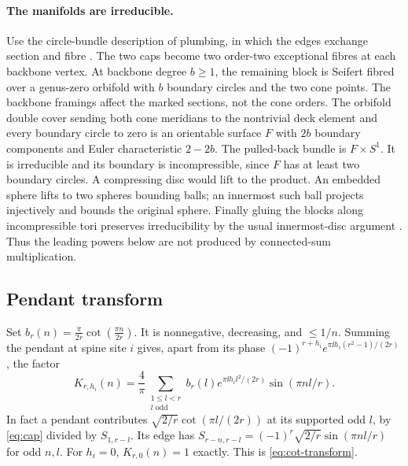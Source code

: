 \paragraph{The manifolds are irreducible.}
Use the circle-bundle description of plumbing, in which the edges exchange section and fibre \cite{EN}. The two caps become two order-two exceptional fibres at each backbone vertex. At backbone degree \(b\ge1\), the remaining block is Seifert fibred over a genus-zero orbifold with \(b\) boundary circles and the two cone points. The backbone framings affect the marked sections, not the cone orders. The orbifold double cover sending both cone meridians to the nontrivial deck element and every boundary circle to zero is an orientable surface \(F\) with \(2b\) boundary components and Euler characteristic \(2-2b\). The pulled-back bundle is \(F\times S^1\). It is irreducible and its boundary is incompressible, since \(F\) has at least two boundary circles. A compressing disc would lift to the product. An embedded sphere lifts to two spheres bounding balls; an innermost such ball projects injectively and bounds the original sphere. Finally gluing the blocks along incompressible tori preserves irreducibility by the usual innermost-disc argument \cite{Hatcher}. Thus the leading powers below are not produced by connected-sum multiplication.

\subsection{Pendant transform}
Set \(b_r(n)=\frac{\pi}{2r}\cot(\frac{\pi n}{2r})\). It is nonnegative, decreasing, and \(\le1/n\). Summing the pendant at spine site \(i\) gives, apart from its phase \((-1)^{r+h_i}e^{\pi\ii h_i(r^2-1)/(2r)}\), the factor
\begin{equation}\label{eq:pend}
 K_{r,h_i}(n)=\frac4\pi\sum_{\substack{1\le l<r\\l\text{ odd}}}
       b_r(l)e^{\pi\ii h_i l^2/(2r)}\sin(\pi nl/r).
\end{equation}
In fact a pendant contributes \(\sqrt{2/r}\cot(\pi l/(2r))\) at its supported odd \(l\), by \eqref{eq:cap} divided by \(S_{1,r-l}\). Its edge has \(S_{r-n,r-l}=(-1)^r\sqrt{2/r}\sin(\pi nl/r)\) for odd \(n,l\). For \(h_i=0\), \(K_{r,0}(n)=1\) exactly. This is \eqref{eq:cot-transform}.

